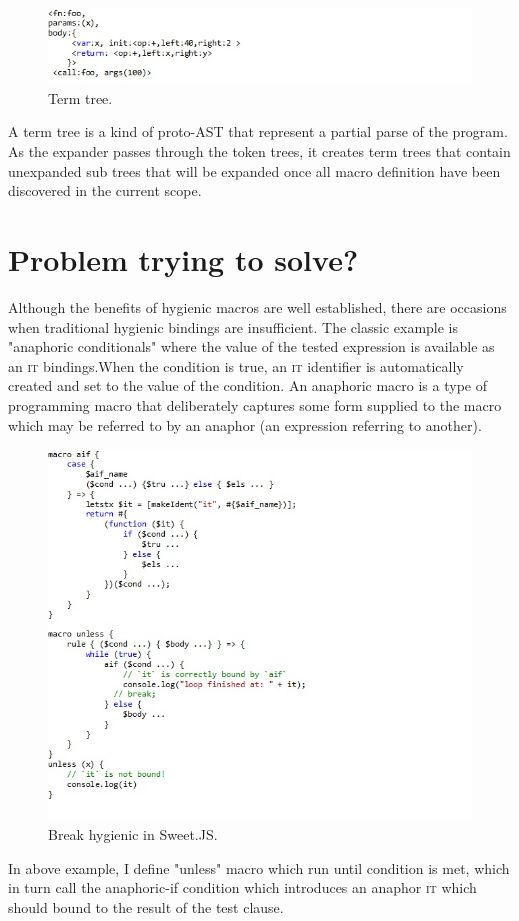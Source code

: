 \begin{figure}[htb]
\centering
\includegraphics[width=1.0\textwidth]{images/enforest1.jpg}
\caption{Term tree.} 
\label{fig:AST}

\end{figure}

A term tree is a kind of proto-AST that represent a partial parse of the program. As the expander passes through the token trees, it creates term trees that contain unexpanded sub trees that will be expanded once all macro definition have been discovered in the current scope.

\section{Problem trying to solve?}

Although the benefits of hygienic macros are well established, there are occasions when traditional hygienic bindings are insufficient. The classic example is "anaphoric conditionals" where the value of the tested expression is available as an \textsc{it} bindings.When the condition is true, an \textsc{it} identifier is automatically created and set to the value of the condition. An anaphoric macro is a type of programming macro that deliberately captures some form supplied to the macro which may be referred to by an anaphor (an expression referring to another).

\newpage
\begin{figure}
\centering
\includegraphics[width=1.0\textwidth]{images/Breakhygiene.jpg}
\caption{Break hygienic in Sweet.JS.} 
\label{fig:Breakhygiene}

\end{figure}
In above example, I define "unless" macro which run until condition is met, which in turn call the anaphoric-if condition which introduces an anaphor \textsc{it} which should bound to the result of the test clause.

